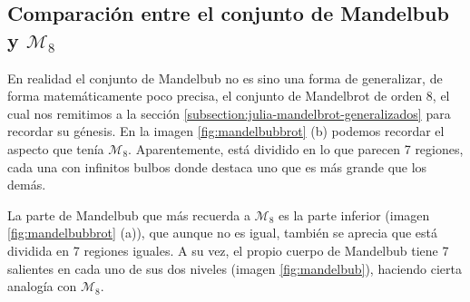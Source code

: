 \subsection{Comparación entre el conjunto de Mandelbub y $\mathcal{M}_8$}

En realidad el conjunto de Mandelbub no es sino una forma de generalizar, de forma matemáticamente poco precisa, el conjunto de Mandelbrot de orden 8, el cual nos remitimos a la sección \ref{subsection:julia-mandelbrot-generalizados} para recordar su génesis. En la imagen \ref{fig:mandelbubbrot} (b) podemos recordar el aspecto que tenía $\mathcal{M}_8$. Aparentemente, está dividido en lo que parecen 7 regiones, cada una con infinitos bulbos donde destaca uno que es más grande que los demás. 

La parte de Mandelbub que más recuerda a $\mathcal{M}_8$ es la parte inferior (imagen \ref{fig:mandelbubbrot} (a)), que aunque no es igual, también se aprecia que está dividida en 7 regiones iguales. A su vez, el propio cuerpo de Mandelbub tiene 7 salientes en cada uno de sus dos niveles (imagen \ref{fig:mandelbub}), haciendo cierta analogía con $\mathcal{M}_8$. 

\newpage

